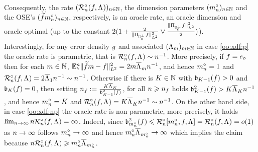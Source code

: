 \begin{te}
\begin{multline}
  \end{multline}
Consequently, the  rate $\Nsuite[\ssY]{\oRa{\xdf,\iSv}}$, the dimension parameters $\Nsuite[\ssY]{\oDi{\ssY}}$  and  the OSE's
  $\Nsuite[\ssY]{\txdfPr[\oDi{\ssY}]}$, respectively, is an oracle
rate, an oracle dimension and oracle optimal (up to the
constant
$2(1+\tfrac{2}{\VnormLp{\Proj[{\mHiH[0]^\perp}]\xdf}^2}\vee\tfrac{\VnormLp{\Proj[{\mHiH[0]^\perp}]\xdf}^2}{2})$).\\


Interestingly, for any error density $\edf$ and associated $\Nsuite[\Di]{\iSv[\Di]}$ in case \ref{oo:xdf:p} the oracle rate is parametric, that is
$\oRa{\xdf,\iSv}\sim\ssY^{-1}$. More precisely, if $\xdf=\bas_o$ then
for each  $\Di\in\Nz$,
$\FuEx[\ssY]{\ydf}\VnormLp{\txdfPr-\xdf}^2=2\Di\oiSv[\Di]\ssY^{-1}$,
and hence $\oDi{\ssY}=1$ and $\oRa{\xdf,\iSv}=2\oiSv[1]\ssY^{-1}\sim\ssY^{-1}$. Otherwise
if there is $K\in\Nz$  with $\bias[K-1](\xdf)>0$ and
$\bias[K](\xdf)=0$, then setting
$\ssY_{\xdf}:=\tfrac{K\oiSv[K]}{\bias[K-1]^2(\xdf)}$, for all
$\ssY\geq \ssY_{\xdf}$ holds
$\bias[K-1]^2(\xdf)>K\oiSv[K]\ssY^{-1}$, and hence  $\oDi{\ssY}=K$ and
$\oRa{\xdf,\iSv}= K\oiSv[K]\ssY^{-1}\sim \ssY^{-1}$.
On the other hand side, in case \ref{oo:xdf:np} the oracle rate is
non-parametric, more precisely, it holds
$\lim_{\ssY\to\infty}\ssY\oRa{\xdf,\iSv}=\infty$. Indeed, since
$\bias[\oDi{\ssY}]^2(\xdf)\leq\oRaDi{\oDi{\ssY},\xdf,\iSv}=\oRa{\xdf,\iSv}=o(1)$ as $\ssY\to\infty$
follows $\oDi{\ssY}\to\infty$ and hence
$\oDi{\ssY}\oiSv[\oDi{\ssY}]\to\infty$ which implies the claim because
$\ssY\oRa{\xdf,\iSv}\geq\oDi{\ssY}\oiSv[\oDi{\ssY}]$.
\end{te}
